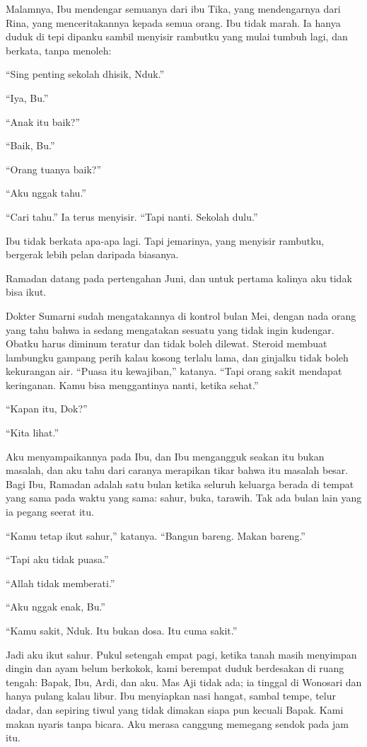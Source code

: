 \documentclass[11pt,twoside,openany]{book}
\makeatletter
\newcommand{\scenebreak}{\par\vspace{0.9em}{\centering\textsc{*\hspace{0.7em}*\hspace{0.7em}*}\par}\vspace{0.9em}\@afterindentfalse\@afterheading}
\makeatother
\begin{document}
Malamnya, Ibu mendengar semuanya dari ibu Tika, yang mendengarnya dari Rina, yang menceritakannya kepada semua orang. Ibu tidak marah. Ia hanya duduk di tepi dipanku sambil menyisir rambutku yang mulai tumbuh lagi, dan berkata, tanpa menoleh:

``Sing penting sekolah dhisik, Nduk.''

``Iya, Bu.''

``Anak itu baik?''

``Baik, Bu.''

``Orang tuanya baik?''

``Aku nggak tahu.''

``Cari tahu.'' Ia terus menyisir. ``Tapi nanti. Sekolah dulu.''

Ibu tidak berkata apa-apa lagi. Tapi jemarinya, yang menyisir rambutku, bergerak lebih pelan daripada biasanya.

\scenebreak
Ramadan datang pada pertengahan Juni, dan untuk pertama kalinya aku tidak bisa ikut.

Dokter Sumarni sudah mengatakannya di kontrol bulan Mei, dengan nada orang yang tahu bahwa ia sedang mengatakan sesuatu yang tidak ingin kudengar. Obatku harus diminum teratur dan tidak boleh dilewat. Steroid membuat lambungku gampang perih kalau kosong terlalu lama, dan ginjalku tidak boleh kekurangan air. ``Puasa itu kewajiban,'' katanya. ``Tapi orang sakit mendapat keringanan. Kamu bisa menggantinya nanti, ketika sehat.''

``Kapan itu, Dok?''

``Kita lihat.''

Aku menyampaikannya pada Ibu, dan Ibu mengangguk seakan itu bukan masalah, dan aku tahu dari caranya merapikan tikar bahwa itu masalah besar. Bagi Ibu, Ramadan adalah satu bulan ketika seluruh keluarga berada di tempat yang sama pada waktu yang sama: sahur, buka, tarawih. Tak ada bulan lain yang ia pegang seerat itu.

``Kamu tetap ikut sahur,'' katanya. ``Bangun bareng. Makan bareng.''

``Tapi aku tidak puasa.''

``Allah tidak memberati.''

``Aku nggak enak, Bu.''

``Kamu sakit, Nduk. Itu bukan dosa. Itu cuma sakit.''

Jadi aku ikut sahur. Pukul setengah empat pagi, ketika tanah masih menyimpan dingin dan ayam belum berkokok, kami berempat duduk berdesakan di ruang tengah: Bapak, Ibu, Ardi, dan aku. Mas Aji tidak ada; ia tinggal di Wonosari dan hanya pulang kalau libur. Ibu menyiapkan nasi hangat, sambal tempe, telur dadar, dan sepiring tiwul yang tidak dimakan siapa pun kecuali Bapak. Kami makan nyaris tanpa bicara. Aku merasa canggung memegang sendok pada jam itu.
\end{document}
